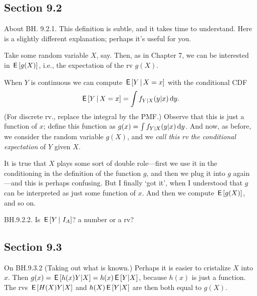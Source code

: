 \subsection*{Section 9.2}
\label{sec:section-9.2}

\begin{remark} About BH. 9.2.1. This definition is subtle, and it takes time to understand.
Here is a slightly different explanation; perhaps it's useful for you.

Take some random variable $X$, say.
Then, as in Chapter 7,  we can be interested in  $\,\mathsf{E}\left[g(X)\right]$, i.e., the expectation of the rv $g(X)$.

When $Y$ is continuous we can compute $\,\mathsf{E}\left[Y \,\middle|\, X=x\right]$ with  the conditional CDF
\begin{align*}
\,\mathsf{E}\left[Y\,\middle|\, X=x \right] =\int f_{Y| X}(y | x) \,\textrm{d}y.
\end{align*}
(For discrete rv., replace the integral by the PMF.)
Observe that this is just a function of $x$; define this function as $g(x) = \int f_{Y| X}(y | x)\,\textrm{d}y$. And now, as before, we consider the random variable $g(X)$, and we  \emph{call this rv the conditional expectation} of $Y$ given $X$.

It is true that $X$ plays some sort of double role---first we use it in the conditioning in the definition of the function $g$, and then we plug it into  $g$ again---and this is perhaps confusing. But I finally `got  it', when I understood that $g$ can be interpreted as just some function of $x$. And then we compute $\,\mathsf{E}\left[g(X)\right]$, and so on.
\end{remark}



\begin{exercise}
BH.9.2.2. Is $\,\mathsf{E}\left[Y\,\middle|\, \,I_{A}\right]$? a number or a rv?
\begin{hint}
\end{hint}
\begin{solution}
\end{solution}
\end{exercise}


\subsection*{Section 9.3}
\label{sec:section-9.3}

\begin{remark}
On BH.9.3.2 (Taking out what is known.) Perhaps it is easier to cristalize  $X$ into $x$. Then $g(x) = \,\mathsf{E}\left[h(x) Y|X\right] = h(x) \,\mathsf{E}\left[Y|X\right]$, because $h(x)$ is just a function. The rvs $\,\mathsf{E}\left[H(X) Y|X\right]$ and $h(X) \,\mathsf{E}\left[Y|X\right]$ are then both  equal to $g(X)$.
\end{remark}

